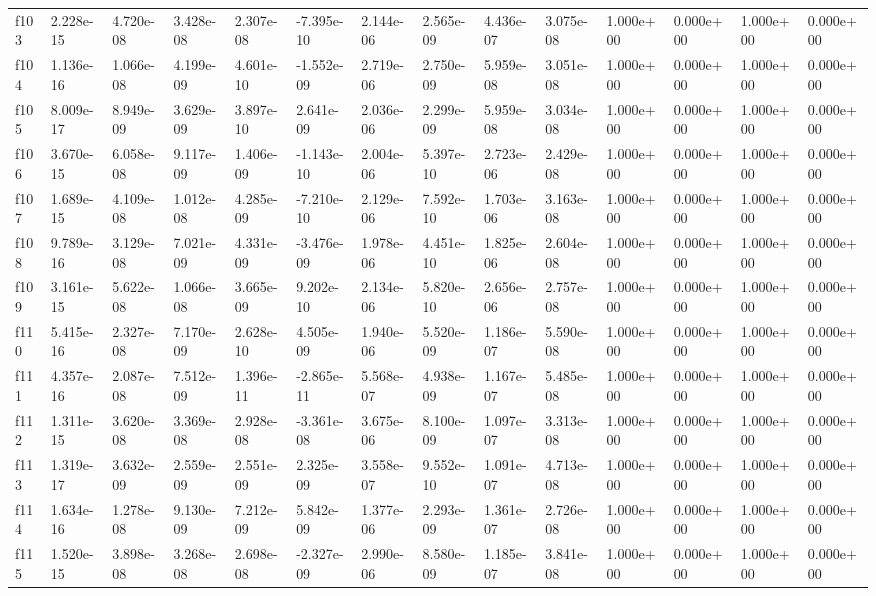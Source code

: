 \begin{table}
\begin{tabular}{llllllllllllll}
f103 & 2.228e-15 & 4.720e-08 & 3.428e-08 & 2.307e-08 & -7.395e-10 & 2.144e-06 & 2.565e-09 & 4.436e-07 & 3.075e-08 & 1.000e+00 & 0.000e+00 & 1.000e+00 & 0.000e+00 \\
f104 & 1.136e-16 & 1.066e-08 & 4.199e-09 & 4.601e-10 & -1.552e-09 & 2.719e-06 & 2.750e-09 & 5.959e-08 & 3.051e-08 & 1.000e+00 & 0.000e+00 & 1.000e+00 & 0.000e+00 \\
f105 & 8.009e-17 & 8.949e-09 & 3.629e-09 & 3.897e-10 & 2.641e-09 & 2.036e-06 & 2.299e-09 & 5.959e-08 & 3.034e-08 & 1.000e+00 & 0.000e+00 & 1.000e+00 & 0.000e+00 \\
f106 & 3.670e-15 & 6.058e-08 & 9.117e-09 & 1.406e-09 & -1.143e-10 & 2.004e-06 & 5.397e-10 & 2.723e-06 & 2.429e-08 & 1.000e+00 & 0.000e+00 & 1.000e+00 & 0.000e+00 \\
f107 & 1.689e-15 & 4.109e-08 & 1.012e-08 & 4.285e-09 & -7.210e-10 & 2.129e-06 & 7.592e-10 & 1.703e-06 & 3.163e-08 & 1.000e+00 & 0.000e+00 & 1.000e+00 & 0.000e+00 \\
f108 & 9.789e-16 & 3.129e-08 & 7.021e-09 & 4.331e-09 & -3.476e-09 & 1.978e-06 & 4.451e-10 & 1.825e-06 & 2.604e-08 & 1.000e+00 & 0.000e+00 & 1.000e+00 & 0.000e+00 \\
f109 & 3.161e-15 & 5.622e-08 & 1.066e-08 & 3.665e-09 & 9.202e-10 & 2.134e-06 & 5.820e-10 & 2.656e-06 & 2.757e-08 & 1.000e+00 & 0.000e+00 & 1.000e+00 & 0.000e+00 \\
f110 & 5.415e-16 & 2.327e-08 & 7.170e-09 & 2.628e-10 & 4.505e-09 & 1.940e-06 & 5.520e-09 & 1.186e-07 & 5.590e-08 & 1.000e+00 & 0.000e+00 & 1.000e+00 & 0.000e+00 \\
f111 & 4.357e-16 & 2.087e-08 & 7.512e-09 & 1.396e-11 & -2.865e-11 & 5.568e-07 & 4.938e-09 & 1.167e-07 & 5.485e-08 & 1.000e+00 & 0.000e+00 & 1.000e+00 & 0.000e+00 \\
f112 & 1.311e-15 & 3.620e-08 & 3.369e-08 & 2.928e-08 & -3.361e-08 & 3.675e-06 & 8.100e-09 & 1.097e-07 & 3.313e-08 & 1.000e+00 & 0.000e+00 & 1.000e+00 & 0.000e+00 \\
f113 & 1.319e-17 & 3.632e-09 & 2.559e-09 & 2.551e-09 & 2.325e-09 & 3.558e-07 & 9.552e-10 & 1.091e-07 & 4.713e-08 & 1.000e+00 & 0.000e+00 & 1.000e+00 & 0.000e+00 \\
f114 & 1.634e-16 & 1.278e-08 & 9.130e-09 & 7.212e-09 & 5.842e-09 & 1.377e-06 & 2.293e-09 & 1.361e-07 & 2.726e-08 & 1.000e+00 & 0.000e+00 & 1.000e+00 & 0.000e+00 \\
f115 & 1.520e-15 & 3.898e-08 & 3.268e-08 & 2.698e-08 & -2.327e-09 & 2.990e-06 & 8.580e-09 & 1.185e-07 & 3.841e-08 & 1.000e+00 & 0.000e+00 & 1.000e+00 & 0.000e+00 \\

\end{tabular}
\end{table}
